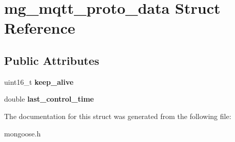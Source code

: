 \hypertarget{structmg__mqtt__proto__data}{}\section{mg\+\_\+mqtt\+\_\+proto\+\_\+data Struct Reference}
\label{structmg__mqtt__proto__data}
\subsection*{Public Attributes}
\begin{DoxyCompactItemize}
\item 
\mbox{\label{structmg__mqtt__proto__data_add8062f8f2802a844056ead961485bc0}} 
uint16\+\_\+t {\bfseries keep\+\_\+alive}
\item 
\mbox{\label{structmg__mqtt__proto__data_afebe290ccf2c1929b1c05a25bfe7f4d7}} 
double {\bfseries last\+\_\+control\+\_\+time}
\end{DoxyCompactItemize}


The documentation for this struct was generated from the following file\+:\begin{DoxyCompactItemize}
\item 
mongoose.\+h\end{DoxyCompactItemize}
